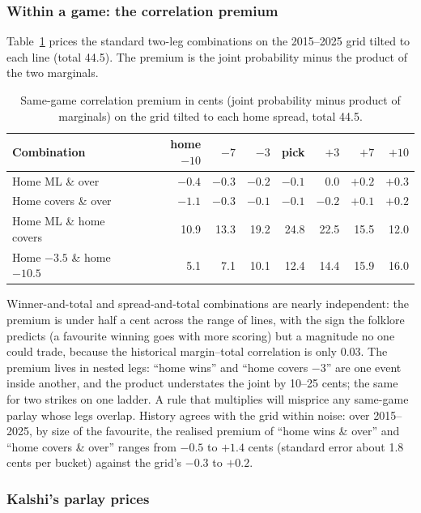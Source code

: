\subsubsection{Within a game: the correlation premium}

Table~\ref{tab:sgp} prices the standard two-leg combinations on the 2015--2025 grid tilted to each line (total 44.5). The premium is the joint probability minus the product of the two marginals.

\begin{table}[H]
\centering
\small
\begin{tabular}{lrrrrrrr}
\toprule
\textbf{Combination} & \textbf{home $-10$} & $-7$ & $-3$ & \textbf{pick} & $+3$ & $+7$ & $+10$ \\
\midrule
Home ML \& over & $-0.4$ & $-0.3$ & $-0.2$ & $-0.1$ & $0.0$ & $+0.2$ & $+0.3$ \\
Home covers \& over & $-1.1$ & $-0.3$ & $-0.1$ & $-0.1$ & $-0.2$ & $+0.1$ & $+0.2$ \\
Home ML \& home covers & 10.9 & 13.3 & 19.2 & 24.8 & 22.5 & 15.5 & 12.0 \\
Home $-3.5$ \& home $-10.5$ & 5.1 & 7.1 & 10.1 & 12.4 & 14.4 & 15.9 & 16.0 \\
\bottomrule
\end{tabular}
\caption{Same-game correlation premium in cents (joint probability minus product of marginals) on the grid tilted to each home spread, total 44.5.}
\label{tab:sgp}
\end{table}

Winner-and-total and spread-and-total combinations are nearly independent: the premium is under half a cent across the range of lines, with the sign the folklore predicts (a favourite winning goes with more scoring) but a magnitude no one could trade, because the historical margin--total correlation is only 0.03. The premium lives in nested legs: ``home wins'' and ``home covers $-3$'' are one event inside another, and the product understates the joint by 10--25 cents; the same for two strikes on one ladder. A rule that multiplies will misprice any same-game parlay whose legs overlap. History agrees with the grid within noise: over 2015--2025, by size of the favourite, the realised premium of ``home wins \& over'' and ``home covers \& over'' ranges from $-0.5$ to $+1.4$ cents (standard error about 1.8 cents per bucket) against the grid's $-0.3$ to $+0.2$.

\subsubsection{Kalshi's parlay prices}

